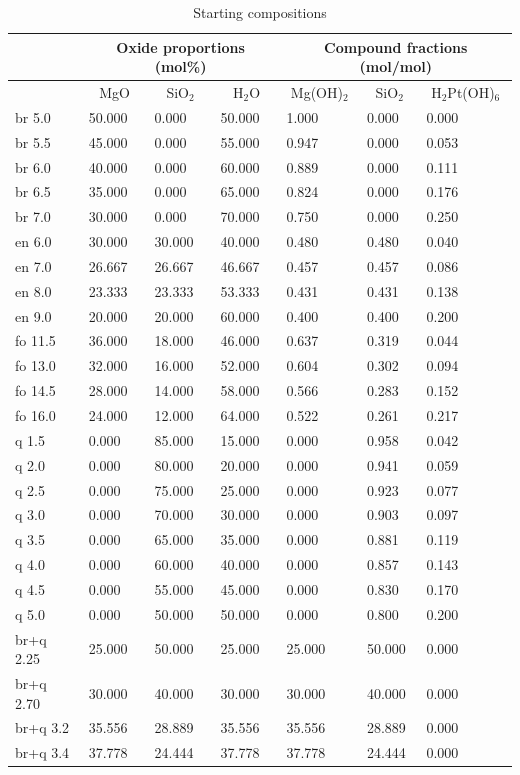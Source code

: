 \documentclass[review]{elsarticle}
\begin{document}
\begin{table}[ht!]
\caption{Starting compositions}
\label{table:compositions}
\begin{tabular}{l|lll|lll}
 & \multicolumn{3}{c}{Oxide proportions (mol\%)} & \multicolumn{3}{|c}{Compound fractions (mol/mol)} \\
\hline
 & \multicolumn{1}{c}{MgO} & \multicolumn{1}{c}{SiO$_2$} & \multicolumn{1}{c}{H$_2$O} & \multicolumn{1}{|c}{Mg(OH)$_2$} & \multicolumn{1}{c}{SiO$_2$} & \multicolumn{1}{c}{H$_2$Pt(OH)$_6$} \\
\hline
br 5.0 & 50.000 & 0.000 & 50.000 & 1.000 & 0.000 & 0.000 \\
br 5.5 & 45.000 & 0.000 & 55.000 & 0.947 & 0.000 & 0.053 \\
br 6.0 & 40.000 & 0.000 & 60.000 & 0.889 & 0.000 & 0.111 \\
br 6.5 & 35.000 & 0.000 & 65.000 & 0.824 & 0.000 & 0.176 \\
br 7.0 & 30.000 & 0.000 & 70.000 & 0.750 & 0.000 & 0.250 \\
en 6.0 & 30.000 & 30.000 & 40.000 & 0.480 & 0.480 & 0.040 \\
en 7.0 & 26.667 & 26.667 & 46.667 & 0.457 & 0.457 & 0.086 \\
en 8.0 & 23.333 & 23.333 & 53.333 & 0.431 & 0.431 & 0.138 \\
en 9.0 & 20.000 & 20.000 & 60.000 & 0.400 & 0.400 & 0.200 \\
fo 11.5 & 36.000 & 18.000 & 46.000 & 0.637 & 0.319 & 0.044 \\
fo 13.0 & 32.000 & 16.000 & 52.000 & 0.604 & 0.302 & 0.094 \\
fo 14.5 & 28.000 & 14.000 & 58.000 & 0.566 & 0.283 & 0.152 \\
fo 16.0 & 24.000 & 12.000 & 64.000 & 0.522 & 0.261 & 0.217 \\
q 1.5 & 0.000 & 85.000 & 15.000	& 0.000	& 0.958	& 0.042 \\
q 2.0 & 0.000 & 80.000 & 20.000 & 0.000 & 0.941 & 0.059 \\
q 2.5 & 0.000 & 75.000 & 25.000 & 0.000 & 0.923 & 0.077 \\
q 3.0 & 0.000 & 70.000 & 30.000 & 0.000 & 0.903 & 0.097 \\
q 3.5 & 0.000 & 65.000 & 35.000 & 0.000 & 0.881 & 0.119 \\
q 4.0 & 0.000 & 60.000 & 40.000 & 0.000 & 0.857 & 0.143 \\
q 4.5 & 0.000 & 55.000 & 45.000 & 0.000 & 0.830 & 0.170 \\
q 5.0 & 0.000 & 50.000 & 50.000 & 0.000 & 0.800 & 0.200 \\
br+q 2.25 & 25.000 & 50.000 & 25.000 & 25.000 & 50.000 & 0.000 \\
br+q 2.70 & 30.000 & 40.000 & 30.000 & 30.000 & 40.000 & 0.000 \\
br+q 3.2 & 35.556 & 28.889 & 35.556 & 35.556 & 28.889 & 0.000 \\
br+q 3.4 & 37.778 & 24.444 & 37.778 & 37.778 & 24.444 & 0.000
\end{tabular}
\end{table}
\end{document}
